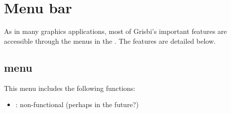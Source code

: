 
\section{Menu bar\label{home-menus}}

As in many graphics applications, most of Grisbi's important features are accessible through the menus in the . The features are detailed below.


\subsection{ menu\label{home-menus-file}}

This menu includes the following functions:

\vspace{3mm}
\begin{itemize}[rightmargin=.6cm]
	\item {}: non-functional (perhaps in the future?) %
\end{itemize}

